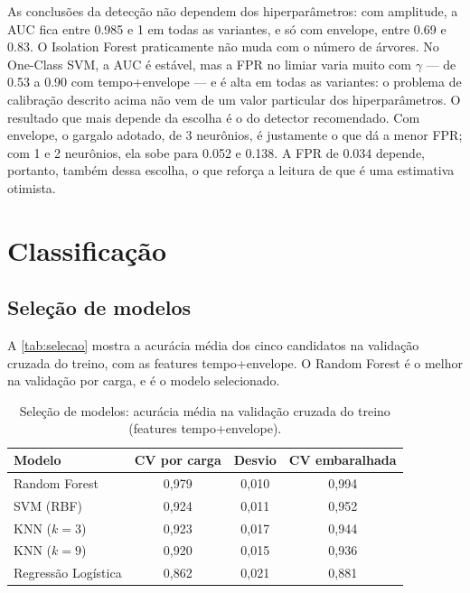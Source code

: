 As conclusões da detecção não dependem dos hiperparâmetros: com amplitude, a AUC
fica entre \num{0.985} e 1 em todas as variantes, e só com envelope, entre
\num{0.69} e \num{0.83}. O Isolation Forest praticamente não muda com o número de
árvores. No One-Class SVM, a AUC é estável, mas a FPR no limiar varia muito com
$\gamma$ --- de \num{0.53} a \num{0.90} com tempo+envelope --- e é alta em todas
as variantes: o problema de calibração descrito acima não vem de um valor
particular dos hiperparâmetros. O resultado que mais depende da escolha é o do
detector recomendado. Com envelope, o gargalo adotado, de 3 neurônios, é
justamente o que dá a menor FPR; com 1 e 2 neurônios, ela sobe para \num{0.052} e
\num{0.138}. A FPR de \num{0.034} depende, portanto, também dessa escolha, o que
reforça a leitura de que é uma estimativa otimista.

\section{Classificação}
\label{sec:res-classificacao}

\subsection{Seleção de modelos}
\label{sec:res-selecao}

A \autoref{tab:selecao} mostra a acurácia média
dos cinco candidatos na validação cruzada do treino, com as features
tempo+envelope. O Random Forest é o melhor na validação por carga, e é o modelo
selecionado.

\begin{table}[htb]
  \centering
  \caption{Seleção de modelos: acurácia média na validação cruzada do treino
  (features tempo+envelope).}
  \label{tab:selecao}
  \footnotesize
  \begin{tabular}{lccc}
    \toprule
    \textbf{Modelo} & \textbf{CV por carga} & \textbf{Desvio} & \textbf{CV embaralhada} \\
    \midrule
    Random Forest        & 0,979 & 0,010 & 0,994 \\
    SVM (RBF)            & 0,924 & 0,011 & 0,952 \\
    KNN ($k = 3$)        & 0,923 & 0,017 & 0,944 \\
    KNN ($k = 9$)        & 0,920 & 0,015 & 0,936 \\
    Regressão Logística  & 0,862 & 0,021 & 0,881 \\
    \bottomrule
  \end{tabular}
\end{table}

